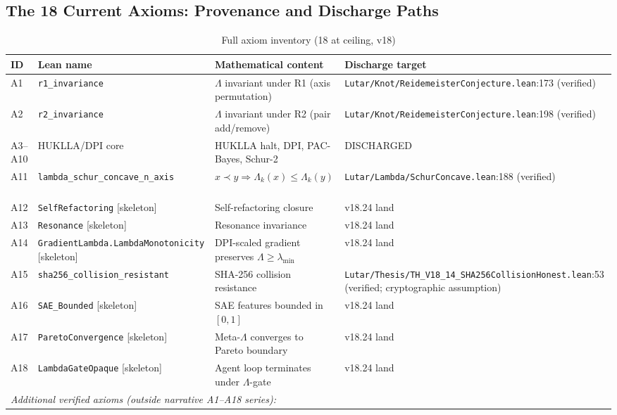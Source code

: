 \subsection{The 18 Current Axioms: Provenance and Discharge Paths}
\label{subsec:current-axioms}

\begin{table}[h!]
\centering\small
\caption{Full axiom inventory (18 at ceiling, v18)}
\label{tab:axioms}
\begin{tabular}{llp{3.5cm}p{3.5cm}}
\hline
\textbf{ID} & \textbf{Lean name} & \textbf{Mathematical content} & \textbf{Discharge target} \\
\hline
A1 & \texttt{r1\_invariance} & $\Lambda$ invariant under R1 (axis permutation)~\cite{Reidemeister1927} & \texttt{Lutar/Knot/ReidemeisterConjecture.lean}:173 (verified) \\
A2 & \texttt{r2\_invariance} & $\Lambda$ invariant under R2 (pair add/remove)~\cite{Reidemeister1927} & \texttt{Lutar/Knot/ReidemeisterConjecture.lean}:198 (verified) \\
A3--A10 & HUKLLA/DPI core & HUKLLA halt, DPI, PAC-Bayes, Schur-2 & DISCHARGED \\
A11 & \texttt{lambda\_schur\_concave\_n\_axis} & $x \prec y \Rightarrow \Lambda_k(x) \le \Lambda_k(y)$~\cite{HLP1934} & \texttt{Lutar/Lambda/SchurConcave.lean}:188 (verified) \\
A12 & \texttt{SelfRefactoring} [skeleton] & Self-refactoring closure & v18.24 land \\
A13 & \texttt{Resonance} [skeleton] & Resonance invariance & v18.24 land \\
A14 & \texttt{GradientLambda.LambdaMonotonicity} [skeleton] & DPI-scaled gradient preserves $\Lambda \ge \lambda_{\min}$ & v18.24 land \\
A15 & \texttt{sha256\_collision\_resistant} & SHA-256 collision resistance~\cite{NIST-FIPS-180-4} & \texttt{Lutar/Thesis/TH\_V18\_14\_SHA256CollisionHonest.lean}:53 (verified; cryptographic assumption) \\
A16 & \texttt{SAE\_Bounded} [skeleton] & SAE features bounded in $[0,1]$~\cite{Elhage2022} & v18.24 land \\
A17 & \texttt{ParetoConvergence} [skeleton] & Meta-$\Lambda$ converges to Pareto boundary & v18.24 land \\
A18 & \texttt{LambdaGateOpaque} [skeleton] & Agent loop terminates under $\Lambda$-gate & v18.24 land \\
\hline
\multicolumn{4}{l}{\textit{Additional verified axioms (outside narrative A1--A18 series):}} \\

\end{tabular}
\end{table}
